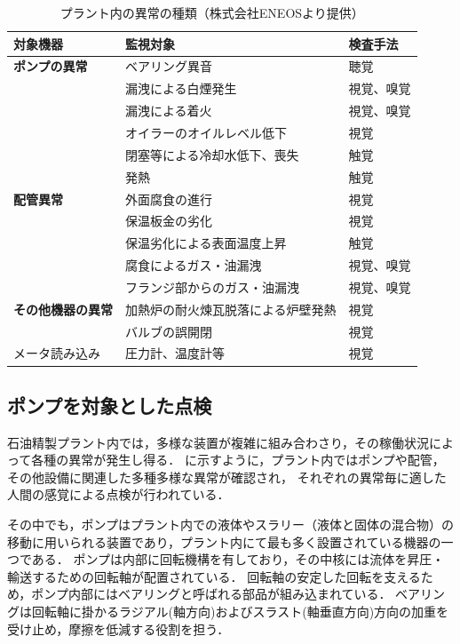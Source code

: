 \documentclass[../main]{subfiles}
\begin{document}
\begin{table}[t]
  \caption{プラント内の異常の種類（株式会社ENEOSより提供）}
  \label{tab:plant_anomalies}
  \centering
  \begin{tabular}{lll}
    \toprule
    対象機器 & 監視対象 & 検査手法 \\
    \midrule
    \textbf{ポンプの異常} & ベアリング異音 & 聴覚 \\
                 & 漏洩による白煙発生 & 視覚、嗅覚 \\
                 & 漏洩による着火 & 視覚、嗅覚 \\
                 & オイラーのオイルレベル低下 & 視覚 \\
                 & 閉塞等による冷却水低下、喪失 & 触覚 \\
                 & 発熱 & 触覚 \\
    \midrule
    \textbf{配管異常} & 外面腐食の進行 & 視覚 \\
               & 保温板金の劣化 & 視覚 \\
               & 保温劣化による表面温度上昇 & 触覚 \\
               & 腐食によるガス・油漏洩 & 視覚、嗅覚 \\
               & フランジ部からのガス・油漏洩 & 視覚、嗅覚 \\
    \midrule
    \textbf{その他機器の異常} & 加熱炉の耐火煉瓦脱落による炉壁発熱 & 視覚 \\
                   & バルブの誤開閉 & 視覚 \\
    \midrule
    メータ読み込み & 圧力計、温度計等 & 視覚 \\
    \bottomrule
  \end{tabular}
\end{table}

\subsection{ポンプを対象とした点検}
\label{sec:intro_plant_characteristics}

石油精製プラント内では，多様な装置が複雑に組み合わさり，その稼働状況によって各種の異常が発生し得る．
に示すように，プラント内ではポンプや配管，その他設備に関連した多種多様な異常が確認され，
それぞれの異常毎に適した人間の感覚による点検が行われている．

その中でも，ポンプはプラント内での液体やスラリー（液体と固体の混合物）の移動に用いられる装置であり，プラント内にて最も多く設置されている機器の一つである．
ポンプは内部に回転機構を有しており，その中核には流体を昇圧・輸送するための回転軸が配置されている．
回転軸の安定した回転を支えるため，ポンプ内部にはベアリングと呼ばれる部品が組み込まれている．
ベアリングは回転軸に掛かるラジアル(軸方向)およびスラスト(軸垂直方向)方向の加重を受け止め，摩擦を低減する役割を担う．
\end{document}
